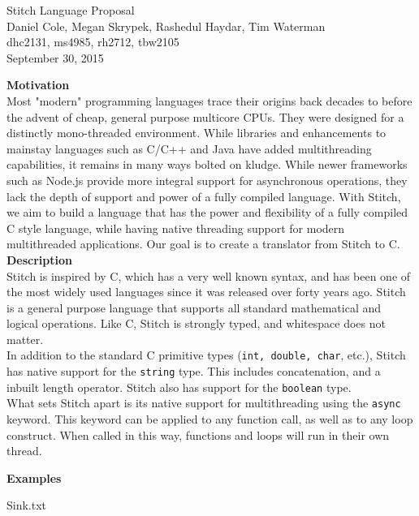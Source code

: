 \documentclass[11pt, oneside]{article}   	%
\date{}							%
\begin{document}
\begin{center}
\LARGE
Stitch Language Proposal\\[2em]
\Large 
Daniel Cole, Megan Skrypek, Rashedul Haydar, Tim Waterman\\
\large dhc2131, ms4985, rh2712, tbw2105\\[2em]
\normalsize
September 30, 2015\\[3em]
\end{center}

\LARGE\textbf{Motivation}\\[.5em]
\normalsize
Most "modern" programming languages trace their origins back decades to before the advent of cheap, general purpose multicore CPUs.  They were designed for a distinctly mono-threaded environment.  While libraries and enhancements to mainstay languages such as C/C++ and Java have added multithreading capabilities, it remains in many ways bolted on kludge.  While newer frameworks such as Node.js provide more integral support for asynchronous operations, they lack the depth of support and power of a fully compiled language.  With Stitch, we aim to build a language that has the power and flexibility of a fully compiled C style language, while having native threading support for modern multithreaded applications.  Our goal is to create a translator from Stitch to C.
\\[3em]
\LARGE\textbf{Description}\\[.5em]
\normalsize
Stitch is inspired by C, which has a very well known syntax, and has been one of the most widely used languages since it was released over forty years ago.  Stitch is a general purpose language that supports all standard mathematical and logical operations.  Like C, Stitch is strongly typed, and whitespace does not matter.\\[.5em]
In addition to the standard C primitive types (\verb|int, double, char|, etc.), Stitch has native support for the \verb|string| type.  This includes concatenation, and a inbuilt length operator.  Stitch also has support for the \verb|boolean| type.\\[.5em]
What sets Stitch apart is its native support for multithreading using the \verb|async| keyword.  This keyword can be applied to any function call, as well as to any loop construct.  When called in this way, functions and loops will run in their own thread. 

\newpage

\LARGE\textbf{Examples}\\[.5em]
\normalsize

{Sink.txt}
\end{document}
